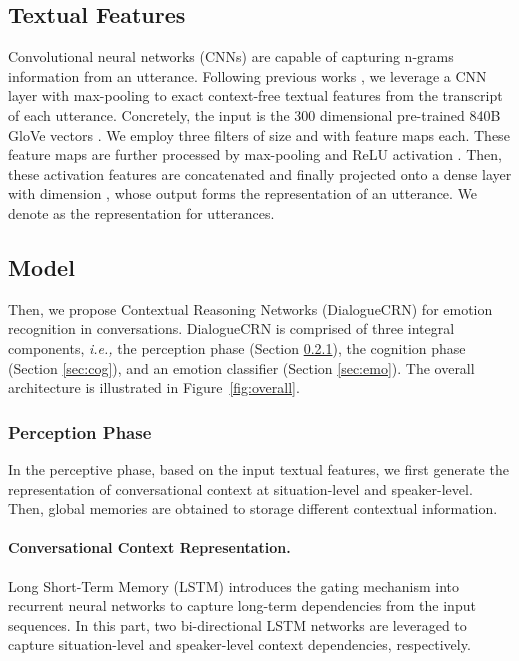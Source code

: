 \documentclass[11pt,a4paper]{article}
\begin{document}
\subsection{Textual Features}
Convolutional neural networks (CNNs) \cite{DBLP:conf/emnlp/Kim14} are capable of capturing n-grams information from an utterance. 
Following previous works \cite{DBLP:conf/naacl/HazarikaPZCMZ18,DBLP:conf/aaai/MajumderPHMGC19,DBLP:conf/emnlp/GhosalMPCG19},
we leverage a CNN layer with max-pooling to exact context-free textual features from the transcript of each utterance.
Concretely, the input is the 300 dimensional pre-trained 840B GloVe vectors  \cite{DBLP:conf/emnlp/PenningtonSM14}.
We employ three filters of size  and  with  feature maps each.
These feature maps are further processed by max-pooling and ReLU activation  \cite{DBLP:conf/icml/NairH10}.
Then, these activation features are concatenated and finally projected onto a dense layer with dimension , whose output forms the representation of an utterance.
We denote  as the representation for  utterances.



\subsection{Model}

Then, we propose Contextual Reasoning Networks (DialogueCRN) for emotion recognition in conversations. 
DialogueCRN is comprised of three integral components, {\it i.e.,} the perception phase (Section \ref{sec:per}), the cognition phase (Section \ref{sec:cog}), and an emotion classifier (Section \ref{sec:emo}). 
The overall architecture is illustrated in Figure~\ref{fig:overall}.

\subsubsection{Perception Phase} \label{sec:per}

In the perceptive phase, based on the input textual features, we first generate the representation of conversational context at situation-level and speaker-level.
Then, global memories are obtained to storage different contextual information.

\paragraph{Conversational Context Representation.}
Long Short-Term Memory (LSTM) \cite{DBLP:journals/neco/HochreiterS97} introduces the gating mechanism into recurrent neural networks to capture long-term dependencies from the input sequences.  
In this part, two bi-directional LSTM networks are leveraged to capture situation-level and speaker-level context dependencies, respectively.
\end{document}

